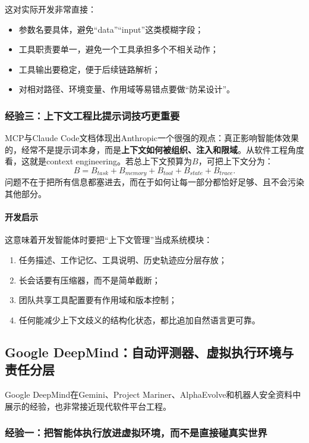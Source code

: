 \documentclass[12pt,a4paper]{article}
\begin{document}
这对实际开发非常直接：
\begin{itemize}
    \item 参数名要具体，避免“data”“input”这类模糊字段；
    \item 工具职责要单一，避免一个工具承担多个不相关动作；
    \item 工具输出要稳定，便于后续链路解析；
    \item 对相对路径、环境变量、作用域等易错点要做“防呆设计”。
\end{itemize}

\subsubsection{经验三：上下文工程比提示词技巧更重要}

MCP与Claude Code文档体现出Anthropic一个很强的观点：真正影响智能体效果的，经常不是提示词本身，而是\textbf{上下文如何被组织、注入和限域}。从软件工程角度看，这就是context engineering。若总上下文预算为$B$，可把上下文分为：
\begin{equation}
B = B_{task} + B_{memory} + B_{tool} + B_{state} + B_{trace}.
\end{equation}
问题不在于把所有信息都塞进去，而在于如何让每一部分都恰好足够、且不会污染其他部分。

\paragraph{开发启示}

这意味着开发智能体时要把“上下文管理”当成系统模块：
\begin{enumerate}
    \item 任务描述、工作记忆、工具说明、历史轨迹应分层存放；
    \item 长会话要有压缩器，而不是简单截断；
    \item 团队共享工具配置要有作用域和版本控制；
    \item 任何能减少上下文歧义的结构化状态，都比追加自然语言更可靠。
\end{enumerate}

\subsection{Google DeepMind：自动评测器、虚拟执行环境与责任分层}

Google DeepMind在Gemini、Project Mariner、AlphaEvolve和机器人安全资料中展示的经验，也非常接近现代软件平台工程。

\subsubsection{经验一：把智能体执行放进虚拟环境，而不是直接碰真实世界}
\end{document}
